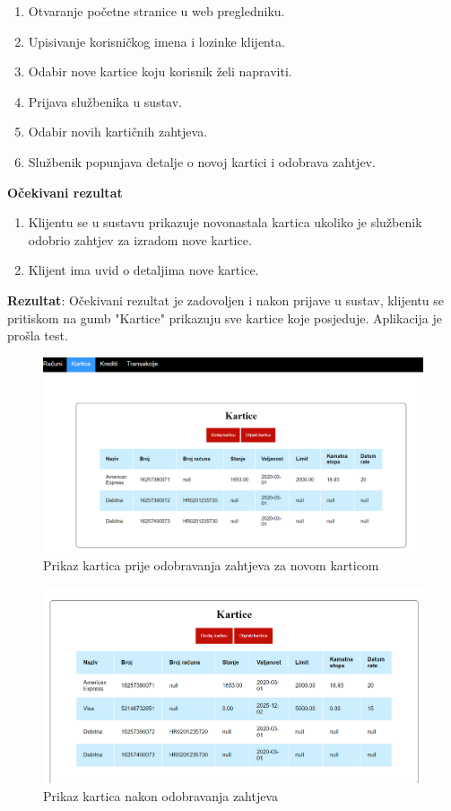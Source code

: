 		\begin{enumerate}
			
			\item Otvaranje početne stranice u web pregledniku.
			\item Upisivanje korisničkog imena i lozinke klijenta.
			\item Odabir nove kartice koju korisnik želi napraviti.
			\item Prijava službenika u sustav.
			\item Odabir novih kartičnih zahtjeva.
			\item Službenik popunjava detalje o novoj kartici i odobrava zahtjev.
		\end{enumerate}
		
		\textbf{Očekivani rezultat}
		
		\begin{enumerate}
			\item Klijentu se u sustavu prikazuje novonastala kartica ukoliko je službenik odobrio zahtjev za izradom nove kartice.
			\item Klijent ima uvid o detaljima nove kartice.
		\end{enumerate}
		
		\textbf{Rezultat}: Očekivani rezultat je zadovoljen i nakon prijave u sustav, klijentu se pritiskom na gumb "Kartice" prikazuju sve kartice koje posjeduje. Aplikacija je prošla test.
		
		\begin{figure}[H]
			\includegraphics[scale=0.5]{slike/karticeprije.PNG}
			\centering
			\caption{Prikaz kartica prije odobravanja zahtjeva za novom karticom}
			\label{fig:prije}
		\end{figure}
		\begin{figure}[H]
			\includegraphics[scale=0.5]{slike/karticeposlije.PNG}
			\centering
			\caption{Prikaz kartica nakon odobravanja zahtjeva}
			\label{fig:poslije}
		\end{figure}
	
